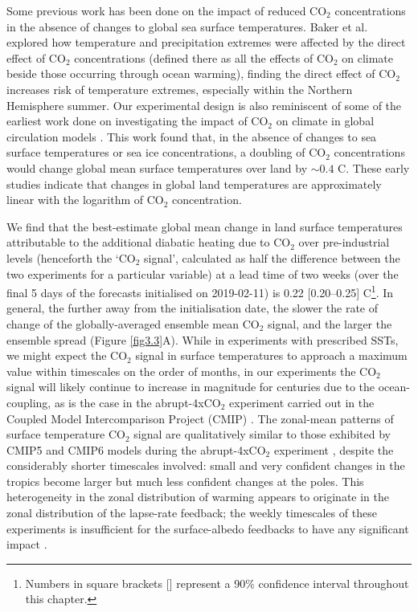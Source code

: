   Some previous work has been done on the impact of reduced CO$_2$ concentrations in the absence of changes to global sea surface temperatures. Baker et al. \citep{baker_higher_2018} explored how temperature and precipitation extremes were affected by the direct effect of CO$_2$ concentrations (defined there as all the effects of CO$_2$ on climate beside those occurring through ocean warming), finding the direct effect of CO$_2$ increases risk of temperature extremes, especially within the Northern Hemisphere summer. Our experimental design is also reminiscent of some of the earliest work done on investigating the impact of CO$_2$ on climate in global circulation models \citep{gates_preliminary_1981,mitchell_seasonal_1983}. This work found that, in the absence of changes to sea surface temperatures or sea ice concentrations, a doubling of CO$_2$ concentrations would change global mean surface temperatures over land by $\sim0.4$ \textdegree{}C. These early studies indicate that changes in global land temperatures are approximately linear with the logarithm of CO$_2$ concentration.
  
  We find that the best-estimate global mean change in land surface temperatures attributable to the additional diabatic heating due to CO$_2$ over pre-industrial levels (henceforth the `CO$_2$ signal', calculated as half the difference between the two experiments for a particular variable) at a lead time of two weeks (over the final 5 days of the forecasts initialised on 2019-02-11) is 0.22 [0.20--0.25] \degree C\footnote{Numbers in square brackets [] represent a 90\% confidence interval throughout this chapter.}. In general, the further away from the initialisation date, the slower the rate of change of the globally-averaged ensemble mean CO$_2$ signal, and the larger the ensemble spread (Figure \ref{fig3.3}A). While in experiments with prescribed SSTs, we might expect the CO$_2$ signal in surface temperatures to approach a maximum value within timescales on the order of months, in our experiments the CO$_2$ signal will likely continue to increase in magnitude for centuries due to the ocean-coupling, as is the case in the abrupt-4xCO$_2$ experiment carried out in the Coupled Model Intercomparison Project (CMIP) \citep{taylor_overview_2012,eyring_overview_2016,rugenstein_equilibrium_2020}. The zonal-mean patterns of surface temperature CO$_2$ signal are qualitatively similar to those exhibited by CMIP5 and CMIP6 models during the abrupt-4xCO$_2$ experiment \citep{flynn_climate_2020,andrews_dependence_2015}, despite the considerably shorter timescales involved: small and very confident changes in the tropics become larger but much less confident changes at the poles. This heterogeneity in the zonal distribution of warming appears to originate in the zonal distribution of the lapse-rate feedback; the weekly timescales of these experiments is insufficient for the surface-albedo feedbacks to have any significant impact \citep{smith_polar_2019}.
  
